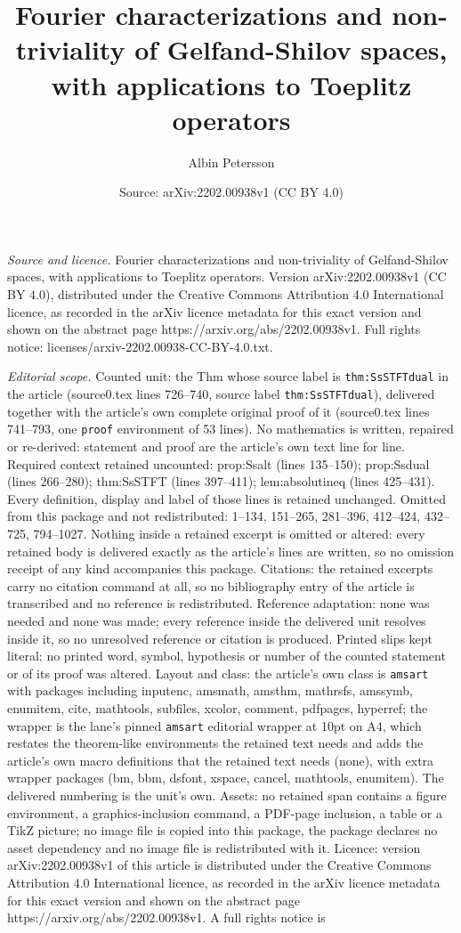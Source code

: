 \documentclass[10pt,a4paper]{amsart}
\title[Fourier characterizations and non-triviality of Gelfand-Shil]{Fourier characterizations and non-triviality of Gelfand-Shilov spaces, with applications to Toeplitz operators}
\author{Albin Petersson}
\date{Source: arXiv:2202.00938v1 (CC BY 4.0)}
\begin{document}
\maketitle

\noindent\emph{Source and licence.} Fourier characterizations and non-triviality of Gelfand-Shilov spaces, with applications to Toeplitz operators. Version arXiv:2202.00938v1 (CC BY 4.0), distributed under the Creative Commons Attribution 4.0 International licence, as recorded in the arXiv licence metadata for this exact version and shown on the abstract page https://arxiv.org/abs/2202.00938v1. Full rights notice: licenses/arxiv-2202.00938-CC-BY-4.0.txt.\par\smallskip

\noindent\textit{Editorial scope.} Counted unit: the Thm whose source label is \texttt{thm:SsSTFTdual} in the article (source0.tex lines 726--740, source label \texttt{thm:SsSTFTdual}), delivered together with the article's own complete original proof of it (source0.tex lines 741--793, one \texttt{proof} environment of 53 lines). No mathematics is written, repaired or re-derived: statement and proof are the article's own text line for line. Required context retained uncounted: prop:Ssalt (lines 135--150); prop:Ssdual (lines 266--280); thm:SsSTFT (lines 397--411); lem:absolutineq (lines 425--431). Every definition, display and label of those lines is retained unchanged. Omitted from this package and not redistributed: 1--134, 151--265, 281--396, 412--424, 432--725, 794--1027. Nothing inside a retained excerpt is omitted or altered: every retained body is delivered exactly as the article's lines are written, so no omission receipt of any kind accompanies this package. Citations: the retained excerpts carry no citation command at all, so no bibliography entry of the article is transcribed and no reference is redistributed. Reference adaptation: none was needed and none was made; every reference inside the delivered unit resolves inside it, so no unresolved reference or citation is produced. Printed slips kept literal: no printed word, symbol, hypothesis or number of the counted statement or of its proof was altered. Layout and class: the article's own class is \texttt{amsart} with packages including inputenc, amsmath, amsthm, mathrsfs, amssymb, enumitem, cite, mathtools, subfiles, xcolor, comment, pdfpages, hyperref; the wrapper is the lane's pinned \texttt{amsart} editorial wrapper at 10pt on A4, which restates the theorem-like environments the retained text needs and adds the article's own macro definitions that the retained text needs (none), with extra wrapper packages (bm, bbm, dsfont, xspace, cancel, mathtools, enumitem). The delivered numbering is the unit's own. Assets: no retained span contains a figure environment, a graphics-inclusion command, a PDF-page inclusion, a table or a TikZ picture; no image file is copied into this package, the package declares no asset dependency and no image file is redistributed with it. Licence: version arXiv:2202.00938v1 of this article is distributed under the Creative Commons Attribution 4.0 International licence, as recorded in the arXiv licence metadata for this exact version and shown on the abstract page https://arxiv.org/abs/2202.00938v1. A full rights notice is 
\end{document}

